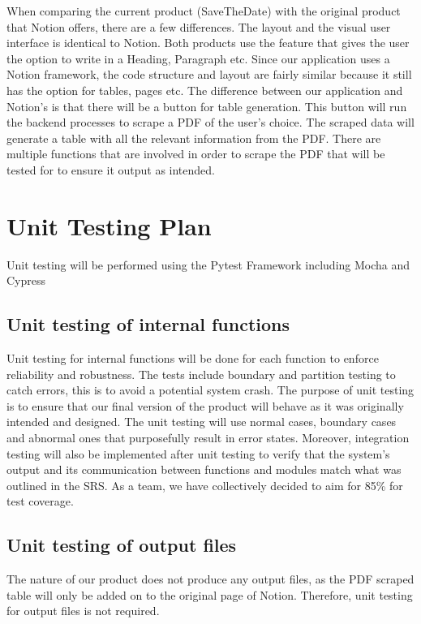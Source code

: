 \documentclass[12pt, titlepage]{article}
\begin{document}
When comparing the current product (SaveTheDate) with the original product that Notion offers, there are a few differences. The layout and the visual user interface is identical to Notion. Both products use the feature that gives the user the option to write in a Heading, Paragraph etc. Since our application uses a Notion framework, the code structure and layout are fairly similar because it still has the option for tables, pages etc. The difference between our application and Notion’s is that there will be a button for table generation. This button will run the backend processes to scrape a PDF of the user’s choice. The scraped data will generate a table with all the relevant information from the PDF. There are multiple functions that are involved in order to scrape the PDF that will be tested for to ensure it output as intended. 
				
\section{Unit Testing Plan}

Unit testing will be performed using the Pytest Framework including Mocha and Cypress
		
\subsection{Unit testing of internal functions}
Unit testing for internal functions will be done for each function to enforce reliability and robustness. The tests include boundary and partition testing to catch errors, this is to avoid a potential system crash.  The purpose of unit testing is to ensure that our final version of the product will behave as it was originally intended and designed. The unit testing will use normal cases, boundary cases and abnormal ones that purposefully result in error states. Moreover, integration testing will also be implemented after unit testing to verify that the system’s output and its communication between functions and modules match what was outlined in the SRS. As a team, we have collectively decided to aim for 85\% for test coverage. 

\subsection{Unit testing of output files}	
The nature of our product does not produce any output files, as the PDF scraped table will only be added on to the original page of Notion. Therefore, unit testing for output files is not required. 	
\end{document}
